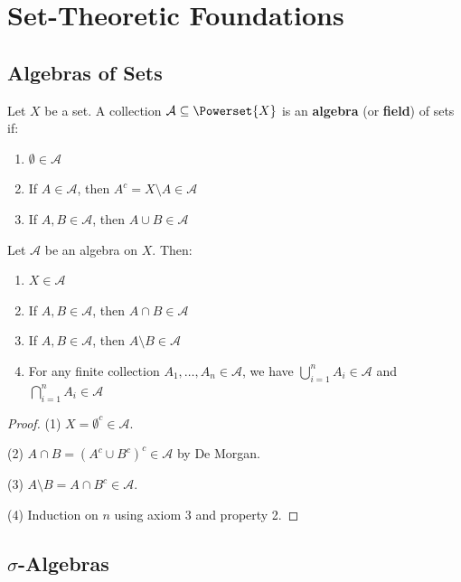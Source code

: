 \chapter{Set-Theoretic Foundations}

\section{Algebras of Sets}

\begin{definition}
Let $X$ be a set. A collection $\mathcal{A} \subseteq \Powerset{X}$ is an \textbf{algebra} (or \textbf{field}) of sets if:
\begin{enumerate}
    \item $\emptyset \in \mathcal{A}$
    \item If $A \in \mathcal{A}$, then $A^c = X \setminus A \in \mathcal{A}$
    \item If $A, B \in \mathcal{A}$, then $A \cup B \in \mathcal{A}$
\end{enumerate}
\end{definition}

\begin{proposition}
Let $\mathcal{A}$ be an algebra on $X$. Then:
\begin{enumerate}
    \item $X \in \mathcal{A}$
    \item If $A, B \in \mathcal{A}$, then $A \cap B \in \mathcal{A}$
    \item If $A, B \in \mathcal{A}$, then $A \setminus B \in \mathcal{A}$
    \item For any finite collection $A_1, \ldots, A_n \in \mathcal{A}$, we have $\bigcup_{i=1}^n A_i \in \mathcal{A}$ and $\bigcap_{i=1}^n A_i \in \mathcal{A}$
\end{enumerate}
\end{proposition}

\begin{proof}
(1) $X = \emptyset^c \in \mathcal{A}$.

(2) $A \cap B = (A^c \cup B^c)^c \in \mathcal{A}$ by De Morgan.

(3) $A \setminus B = A \cap B^c \in \mathcal{A}$.

(4) Induction on $n$ using axiom 3 and property 2.
\end{proof}

\section{$\sigma$-Algebras}

